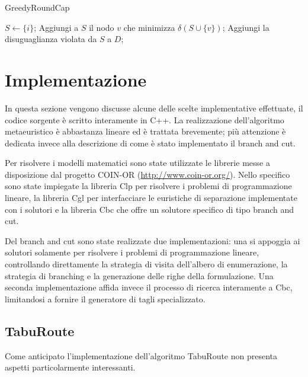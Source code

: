 \documentclass[11pt,oneside,a4paper]{article}
\begin{document}
\begin{algorithm}
\caption{GreedyRoundCap}

\begin{algorithmic}[1]

    \State $S \gets \{i\}$;
    \Repeat
      \State Aggiungi a $S$ il nodo $v$ che minimizza $\delta(S \cup \{v\})$;
        \State Aggiungi la disuguaglianza violata da $S$ a $D$;
      \EndIf
  \EndFor

\end{algorithmic}
\end{algorithm}

\section{Implementazione}
In questa sezione vengono discusse alcune delle scelte implementative effettuate, il codice sorgente
è scritto interamente in C++. La realizzazione dell'algoritmo metaeuristico è abbastanza lineare ed è
trattata brevemente; più attenzione è dedicata invece alla descrizione di come è stato
implementato il branch and cut.

Per risolvere i modelli matematici sono state utilizzate le librerie messe a disposizione dal
progetto COIN-OR (\url{http://www.coin-or.org/}).
Nello specifico sono state impiegate la libreria Clp per risolvere i problemi di programmazione
lineare, la libreria Cgl per interfacciare le euristiche di separazione implementate con i solutori
e la libreria Cbc che offre un solutore specifico di tipo branch and cut.

Del branch and cut sono state realizzate due implementazioni: una si appoggia
ai solutori solamente per risolvere i problemi di programmazione lineare, controllando
direttamente la strategia di visita dell'albero di enumerazione, la strategia di branching e la
generazione delle righe della formulazione. Una seconda implementazione affida invece il processo
di ricerca interamente a Cbc, limitandosi a fornire il generatore di tagli specializzato.

\subsection{TabuRoute}
Come anticipato l'implementazione dell'algoritmo TabuRoute non presenta aspetti particolarmente
interessanti.
\end{document}
